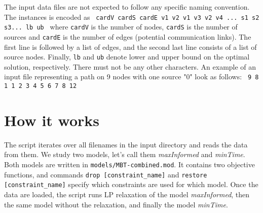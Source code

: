 \documentclass[12pt]{article}
\begin{document}
The input data files are not expected to follow any specific naming convention.
The instances is encoded as \newline\newline
\texttt{
cardV cardS cardE\newline
v1 v2\newline
v1 v3\newline
v2 v4\newline
...\newline
s1 s2 s3...\newline
lb ub\newline\newline
}
where \texttt{cardV} is the number of nodes, \texttt{cardS} is the number of sources and \texttt{cardE} is the number of edges (potential communication links).
The first line is followed by a list of edges, and the second last line consists of a list of source nodes.
Finally, \texttt{lb} and \texttt{ub} denote lower and upper bound on the optimal solution, respectively.
There must not be any other characters.
An example of an input file representing a path on 9 nodes with one source "0" look as follows:\newline\newline
\texttt{
9	8	1	1	2	3	4	5	6	7	8	12\newline\newline
}

\section{How it works}

The script iterates over all filenames in the input directory and reads the data from them.
We study two models, let's call them \emph{maxInformed} and \emph{minTime}.
Both models are written in \texttt{models/MBT-combined.mod}.
It contains two objective functions, and commands \texttt{drop [constraint\_name]} and \texttt{restore [constraint\_name]} specify which constraints are used for which model. 
Once the data are loaded, the script runs LP relaxation of the model \emph{maxInformed}, then the same model without the relaxation, and finally the model \emph{minTime}.
\end{document}
